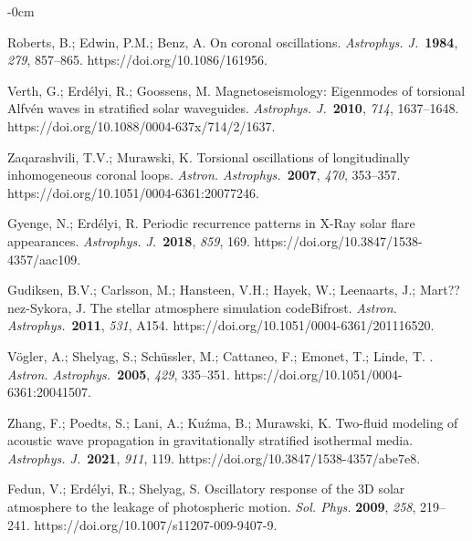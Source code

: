 \documentclass[physics,article,accept,pdftex,moreauthors]{Definitions/mdpi}
\newcommand{\aap}{{\it Astron. Astrophys.}}
\newcommand{\apj}{{\it Astrophys. J.}}
\begin{document}
\begin{adjustwidth}{-\extralength}{0cm}
\begin{thebibliography}{999}
		 Roberts, B.; Edwin, P.M.; Benz, A. On coronal oscillations. \apj~\textbf{1984}, \emph{279}, 857--865. 
 {https://doi.org/10.1086/161956.}

		 Verth, G.; Erd\'elyi, R.; Goossens, M. Magnetoseismology: Eigenmodes of torsional Alfv\'en 
waves in stratified solar waveguides. \apj~\textbf{2010}, \emph{714}, 1637--1648. https://doi.org/10.1088/0004-637x/714/2/1637.

  Zaqarashvili, T.V.; Murawski, K. {Torsional oscillations of 
longitudinally inhomogeneous coronal loops}. \aap~\textbf{2007}, \emph{470}, 353{--357.} https://doi.org/10.1051/0004-6361:20077246.
		
		 Gyenge, N.; Erd\'elyi, R. Periodic recurrence patterns in X-Ray solar flare 
appearances. \apj~\textbf{2018}, \emph{859}, 169. https://doi.org/10.3847/1538-4357/aac109.
		
				Gudiksen, B.V.; Carlsson, M.; Hansteen, V.H.; Hayek, W.; Leenaarts, J.; Mart??nez-Sykora, J. The stellar atmosphere simulation codeBifrost. \aap~\textbf{2011}, \emph{531}, A154. https://doi.org/10.1051/0004-6361/201116520.
		
		{V{\"o}gler}, A.; {Shelyag}, S.; {Sch{\"u}ssler}, M.; {Cattaneo}, F.; {Emonet}, T.; {Linde}, T.
		. \aap~\textbf{2005}, \emph{429}, 335--351. https://doi.org/10.1051/0004-6361:20041507.
		
		Zhang, F.; Poedts, S.; Lani, A.; Ku{\'z}ma, B.; Murawski, K. 
{Two-fluid modeling of acoustic wave propagation in gravitationally stratified isothermal media}.  \apj~\textbf{2021}, \emph{911}, 119. 
https://doi.org/10.3847/1538-4357/abe7e8.
		
		Fedun, V.; Erd\'elyi, R.; Shelyag, S. Oscillatory response of the 3D solar atmosphere to the leakage of photospheric motion. 
\emph{Sol. Phys.} \textbf{2009}, \emph{258}, 219--241. https://doi.org/10.1007/s11207-009-9407-9.
		

\end{thebibliography}
\end{adjustwidth}
\end{document}
